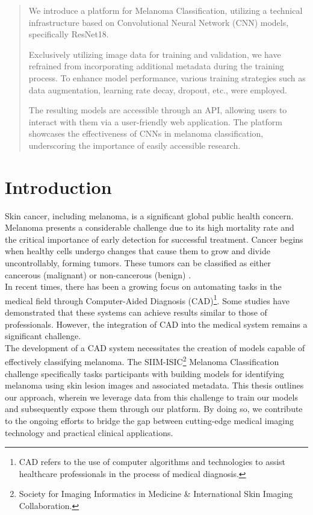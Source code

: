 \begin{abstract}

We introduce a platform for Melanoma Classification, utilizing a technical
infrastructure based on Convolutional Neural Network (CNN) models, specifically
ResNet18.

Exclusively utilizing image data for training and validation, we have refrained
from incorporating additional metadata during the training process. To enhance
model performance, various training strategies such as data augmentation,
learning rate decay, dropout, etc., were employed.

The resulting models are accessible through an API, allowing users to interact
with them via a user-friendly web application. The platform showcases the
effectiveness of CNNs in melanoma classification, underscoring the importance
of easily accessible research.

\end{abstract}


\section{Introduction}

Skin cancer, including melanoma, is a significant global public health concern.
Melanoma presents a considerable challenge due to its high mortality rate and
the critical importance of early detection for successful treatment. Cancer
begins when healthy cells undergo changes that cause them to grow and divide
uncontrollably, forming tumors. These tumors can be classified as either
cancerous (malignant) or non-cancerous (benign) \cite{Melanoma}. \\

In recent times, there has been a growing focus on automating tasks in the
medical field through Computer-Aided Diagnosis (CAD)\footnote{CAD refers to the
use of computer algorithms and technologies to assist healthcare professionals
in the process of medical diagnosis.}. Some studies
\cite{EpidemiologySkinCancer} \cite{SkinCancerDeepLearning} \cite{SkinCancerDeepNN} have demonstrated that
these systems can achieve results similar to those of professionals. However,
the integration of CAD into the medical system remains a significant challenge.
\\

The development of a CAD system necessitates the creation of models capable of
effectively classifying melanoma. The SIIM-ISIC\footnote{Society for Imaging
Informatics in Medicine \& International Skin Imaging Collaboration.} Melanoma
Classification challenge specifically tasks participants with building models
for identifying melanoma using skin lesion images and associated metadata. This
thesis outlines our approach, wherein we leverage data from this challenge to
train our models and subsequently expose them through our platform. By doing
so, we contribute to the ongoing efforts to bridge the gap between cutting-edge
medical imaging technology and practical clinical applications.

